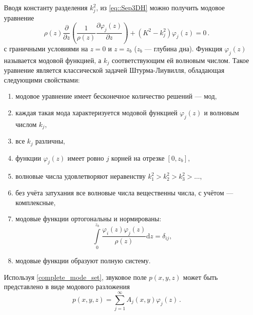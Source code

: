 \documentclass{fefu}
\newcommand{\pa}[1]{\left(#1\right)}
\begin{document}
                    Вводя константу разделения $k_j^2$, из \eqref{eq::Sep3DH} можно получить модовое уравнение
                    \begin{equation}\label{eq::modal_equation}
                        \rho\pa{z}\frac{\partial}{\partial z}\pa{\frac{1}{\rho\pa{z}}\frac{\partial\varphi_j\pa{z}}{\partial z}}+\pa{K^2-k_j^2}\varphi_j\pa{z}=0\,.
                    \end{equation}
                    с граничными условиями на $z=0$ и $z=z_b$ ($z_b$ --- глубина дна). Функция $\varphi_j\pa{z}$ называется модовой функцией, а $k_j$ соответствующим ей волновым числом. Такое уравнение является классической задачей Штурма-Лиувилля, обладающая следующими свойствами:
                    \begin{enumerate}
                        \item модовое уравнение имеет бесконечное количество решений --- мод,
                        \item каждая такая мода характеризуется модовой функцией $\varphi_j\pa{z}$ и волновым числом $k_j$,
                        \item все $k_j$ различны,
                        \item функции $\varphi_j\pa{z}$ имеет ровно $j$ корней на отрезке $\left[0,z_b\right]$,
                        \item волновые числа удовлетворяют неравенству $k_1^2>k_2^2>k_3^2>\dots$,
                        \item без учёта затухания все волновые числа вещественны числа, с учётом --- комплексные,
                        \item модовые функции ортогональны и нормированы:
                            \begin{equation}
                                \int\limits_{0}^{z_b}\frac{\varphi_i\pa{z}\varphi_j\pa{z}}{\rho\pa{z}}\text{d}z=\delta_{ij},
                            \end{equation}
                        \item\label{complete_mode_set} модовые функции образуют полную систему.
                    \end{enumerate}
                    Используя \ref{complete_mode_set}, звуковое поле $p\pa{x,y,z}$ может быть представлено в виде модового разложения
                    \begin{equation}\label{eq::modal_decomposition}
                        p\pa{x,y,z}=\sum\limits_{j=1}^\infty A_j\pa{x,y}\varphi_j\pa{z}\,.
                    \end{equation}
\end{document}
